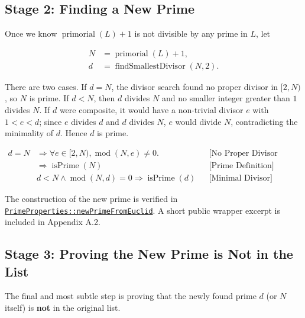 \subsection{Stage 2: Finding a New Prime}
\label{sec:stage-2}

Once we know $\operatorname{primorial}(L)+1$ is not divisible by any prime
in $L$, let

\begin{equation*}
\begin{aligned}
N &= \operatorname{primorial}(L)+1, \\
d &= \operatorname{findSmallestDivisor}(N,2).
\end{aligned}
\end{equation*}

There are two cases. If $d=N$, the divisor search found no proper divisor
in $[2,N)$, so $N$ is prime. If $d < N$, then $d$ divides $N$ and no
smaller integer greater than $1$ divides $N$. If $d$ were composite, it
would have a non-trivial divisor $e$ with $1 < e < d$; since $e$ divides
$d$ and $d$ divides $N$, $e$ would divide $N$, contradicting the
minimality of $d$. Hence $d$ is prime.

\begin{equation*}
\begin{aligned}
d=N
&\Rightarrow \forall e\in[2,N),\operatorname{mod}(N,e)\ne0.
&&\text{[No Proper Divisor Found]} \\
&\Rightarrow \operatorname{isPrime}(N)
&&\text{[Prime Definition]} \\
&d < N \land \operatorname{mod}(N,d)=0 \Rightarrow \operatorname{isPrime}(d)
&&\text{[Minimal Divisor]}
\end{aligned}
\end{equation*}

The construction of the new prime is verified in
\href{https://github.com/thiagomata/prime-numbers/blob/euclid-theorem-article-v1.0.0/src/main/scala/v1/chapter5/prime/properties/PrimeProperties.scala}{\texttt{PrimeProperties::newPrimeFromEuclid}}.
A short public wrapper excerpt is included in Appendix A.2.

\subsection{Stage 3: Proving the New Prime is Not in the List}
\label{sec:stage-3}

The final and most subtle step is proving that the newly found prime $d$
(or $N$ itself) is \textbf{not} in the original list.


